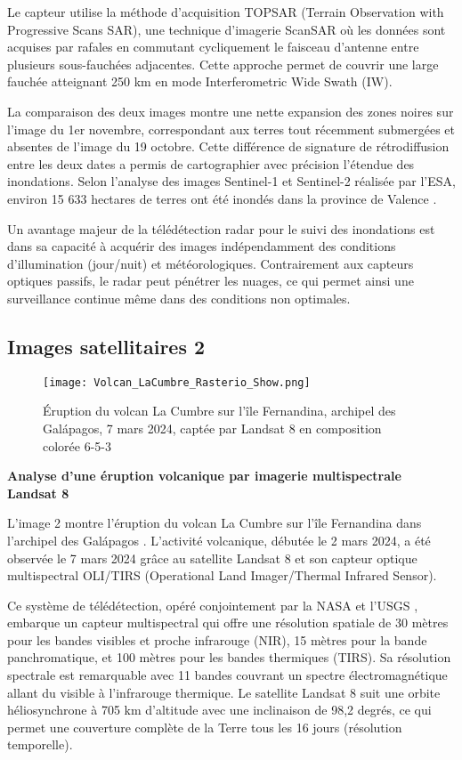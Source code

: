 \documentclass[12pt,a4paper]{article}
\begin{document}
Le capteur utilise la méthode d'acquisition TOPSAR (Terrain Observation with Progressive Scans SAR), une technique d'imagerie ScanSAR où les données sont acquises par rafales en commutant cycliquement le faisceau d'antenne entre plusieurs sous-fauchées adjacentes. Cette approche permet de couvrir une large fauchée atteignant 250 km en mode Interferometric Wide Swath (IW).

La comparaison des deux images montre une nette expansion des zones noires sur l'image du 1er novembre, correspondant aux terres tout récemment submergées et absentes de l'image du 19 octobre. Cette différence de signature de rétrodiffusion entre les deux dates a permis de cartographier avec précision l'étendue des inondations. Selon l'analyse des images Sentinel-1 et Sentinel-2 réalisée par l'ESA, environ 15 633 hectares de terres ont été inondés dans la province de Valence \citep{ESA2024}.

Un avantage majeur de la télédétection radar pour le suivi des inondations est dans sa capacité à acquérir des images indépendamment des conditions d'illumination (jour/nuit) et météorologiques. Contrairement aux capteurs optiques passifs, le radar peut pénétrer les nuages, ce qui permet ainsi une surveillance continue même dans des conditions non optimales.

\subsection{Images satellitaires 2}

\begin{figure}[t]
    \centering
    \texttt{[image: Volcan\_LaCumbre\_Rasterio\_Show.png]}
    \caption{Éruption du volcan La Cumbre sur l'île Fernandina, archipel des Galápagos, 7 mars 2024, captée par Landsat 8 en composition colorée 6-5-3}
    \label{fig:image2}
\end{figure}

\textbf{Analyse d'une éruption volcanique par imagerie multispectrale Landsat 8}

L'image 2 montre l'éruption du volcan La Cumbre sur l'île Fernandina dans l'archipel des Galápagos \citep{NASA2024}. L'activité volcanique, débutée le 2 mars 2024, a été observée le 7 mars 2024 grâce au satellite Landsat 8 et son capteur optique multispectral OLI/TIRS (Operational Land Imager/Thermal Infrared Sensor).

Ce système de télédétection, opéré conjointement par la NASA et l'USGS \citep{USGS2022}, embarque un capteur multispectral qui offre une résolution spatiale de 30 mètres pour les bandes visibles et proche infrarouge (NIR), 15 mètres pour la bande panchromatique, et 100 mètres pour les bandes thermiques (TIRS). Sa résolution spectrale est remarquable avec 11 bandes couvrant un spectre électromagnétique allant du visible à l'infrarouge thermique. Le satellite Landsat 8 suit une orbite héliosynchrone à 705 km d'altitude avec une inclinaison de 98,2 degrés, ce qui permet une couverture complète de la Terre tous les 16 jours (résolution temporelle).
\end{document}
